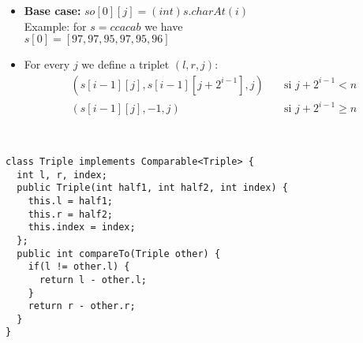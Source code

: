 \begin{itemize}

\item\textbf{Base case: }$so[0][j] = (int)s.charAt(i) $\\
Example: for $s = ccacab$ we have \\$ s[0] = [97, 97, 95, 97, 95, 96]$
\item For every $j$ we define a triplet $(l, r, j)$:
\begin{align*}
(s[i - 1][j], s[i - 1][j + 2^{i - 1}], j) & \quad \text{si $j + 2^{i - 1} < n$} \\
(s[i - 1][j], -1, j) & \quad \text{si $j + 2^{i - 1} \geq n$}
\end{align*}

\end{itemize}
\ \newline
\begin{lstlisting}
class Triple implements Comparable<Triple> {
  int l, r, index;
  public Triple(int half1, int half2, int index) {
    this.l = half1;
    this.r = half2;
    this.index = index;
  };
  public int compareTo(Triple other) {
    if(l != other.l) {
      return l - other.l;
    }
    return r - other.r;
  }
}
\end{lstlisting}
\ \newline
